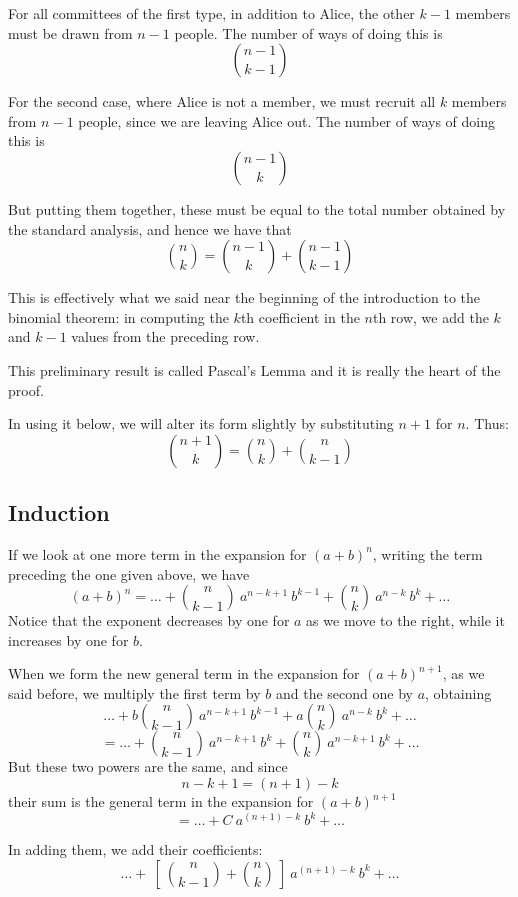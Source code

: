 \documentclass[11pt, oneside]{article}
\begin{document}
For all committees of the first type, in addition to Alice, the other $k-1$ members must be drawn from $n-1$ people. The number of ways of doing this is
\[  {{n-1}\choose{k-1}} \]

For the second case, where Alice is not a member, we must recruit all $k$ members from $n-1$ people, since we are leaving Alice out.  The number of ways of doing this is
\[  {{n-1}\choose{k}} \]

But putting them together, these must be equal to the total number obtained by the standard analysis, and hence we have that
\[  {{n}\choose{k}} = {{n-1}\choose{k}} + {{n-1}\choose{k-1}} \]

This is effectively what we said near the beginning of the introduction to the binomial theorem:  in computing the $k$th coefficient in the $n$th row, we add the $k$ and $k-1$ values from the preceding row.

This preliminary result is called Pascal's Lemma and it is really the heart of the proof.

In using it below, we will alter its form slightly by substituting $n+1$ for $n$.  Thus:
\[  {{n+1}\choose{k}} = {{n}\choose{k}} + {{n}\choose{k-1}} \]

\subsection*{Induction}

If we look at one more term in the expansion for $(a+b)^n$, writing the term preceding the one given above, we have
\[ (a+b)^n = \dots + {{n}\choose{k-1}} \ a^{n-k+1} \ b^{k-1} + {{n}\choose{k}} \ a^{n-k} \ b^k + \dots  \]
Notice that the exponent decreases by one for $a$ as we move to the right, while it increases by one for $b$.

When we form the new general term in the expansion for $(a+b)^{n+1}$, as we said before, we multiply the first term by $b$ and the second one by $a$, obtaining
\[ \dots + b {{n}\choose{k-1}} \ a^{n-k+1} \ b^{k-1} + a {{n}\choose{k}} \ a^{n-k} \ b^k + \dots  \]
\[ = \dots +  {{n}\choose{k-1}} \ a^{n-k+1} \ b^{k} + {{n}\choose{k}} \ a^{n-k + 1} \ b^k + \dots  \]
But these two powers are the same, and since
\[ n-k+1 = (n + 1) - k \]
their sum is the general term in the expansion for $(a+b)^{n+1}$
\[ = \dots + C \ a^{(n+1)-k} \ b^k + \dots  \]

In adding them, we add their coefficients:
\[  \dots +  \ [ \ {{n}\choose{k-1}} + {{n}\choose{k}} \ ] \  a^{(n+1)-k} \ b^{k} + \dots  \]
\end{document}
